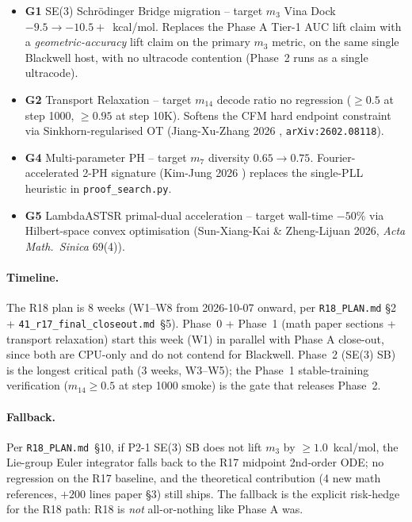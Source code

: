\begin{itemize}
  \item \textbf{G1} SE(3) Schr\"odinger Bridge migration --
        target $m_3$ Vina Dock $-9.5 \to -10.5+$~kcal/mol.
        Replaces the Phase A Tier-1 AUC lift claim with a
        \emph{geometric-accuracy} lift claim on the primary
        $m_3$ metric, on the same single Blackwell host, with no
        ultracode contention (Phase~2 runs as a single ultracode).
  \item \textbf{G2} Transport Relaxation -- target $m_14$ decode
        ratio no regression ($\geq 0.5$ at step 1000, $\geq 0.95$
        at step 10K).  Softens the CFM hard endpoint constraint
        via Sinkhorn-regularised OT (Jiang-Xu-Zhang 2026
        \cite{jiang2026sb_relax}, \texttt{arXiv:2602.08118}).
  \item \textbf{G4} Multi-parameter PH -- target $m_7$ diversity
        $0.65 \to 0.75$.  Fourier-accelerated 2-PH signature
        (Kim-Jung 2026 \cite{kim_jung2026multi_ph}) replaces the
        single-PLL heuristic in \texttt{proof\_search.py}.
  \item \textbf{G5} LambdaASTSR primal-dual acceleration -- target
        wall-time $-50$\% via Hilbert-space convex optimisation
        (Sun-Xiang-Kai \& Zheng-Lijuan 2026,
        \emph{Acta Math.\ Sinica} 69(4)).
\end{itemize}

\paragraph{Timeline.}
The R18 plan is 8 weeks (W1--W8 from 2026-10-07 onward, per
\texttt{R18\_PLAN.md} §2 + \texttt{41\_r17\_final\_closeout.md}~§5).
Phase~0 + Phase~1 (math paper sections + transport relaxation)
start this week (W1) in parallel with Phase A close-out, since
both are CPU-only and do not contend for Blackwell.
Phase~2 (SE(3) SB) is the longest critical path (3 weeks,
W3--W5); the Phase~1 stable-training verification
($m_{14} \geq 0.5$ at step 1000 smoke) is the gate that releases
Phase~2.

\paragraph{Fallback.}
Per \texttt{R18\_PLAN.md}~§10, if P2-1 SE(3) SB does not lift
$m_3$ by $\geq 1.0$~kcal/mol, the Lie-group Euler integrator
falls back to the R17 midpoint 2nd-order ODE; no regression on
the R17 baseline, and the theoretical contribution (4 new math
references, $+200$ lines paper §3) still ships.  The fallback
is the explicit risk-hedge for the R18 path: R18 is \emph{not}
all-or-nothing like Phase A was.


